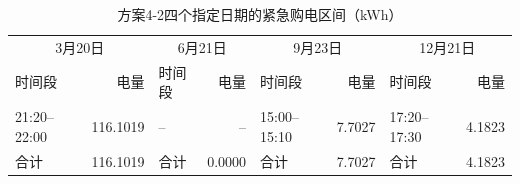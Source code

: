 \begin{table}[H]
\centering\small
\caption{方案4-2四个指定日期的紧急购电区间（kWh）}\label{tab:q4_4-2-emergency}
\setlength{\tabcolsep}{3pt}
\begin{tabular}{lrlrlrlr}
\toprule
\multicolumn{2}{c}{3月20日} & \multicolumn{2}{c}{6月21日} & \multicolumn{2}{c}{9月23日} & \multicolumn{2}{c}{12月21日}\\
时间段 & 电量 & 时间段 & 电量 & 时间段 & 电量 & 时间段 & 电量\\
\midrule
21:20--22:00 & 116.1019 & -- & -- & 15:00--15:10 & 7.7027 & 17:20--17:30 & 4.1823\\
合计 & 116.1019 & 合计 & 0.0000 & 合计 & 7.7027 & 合计 & 4.1823\\
\bottomrule
\end{tabular}
\end{table}
